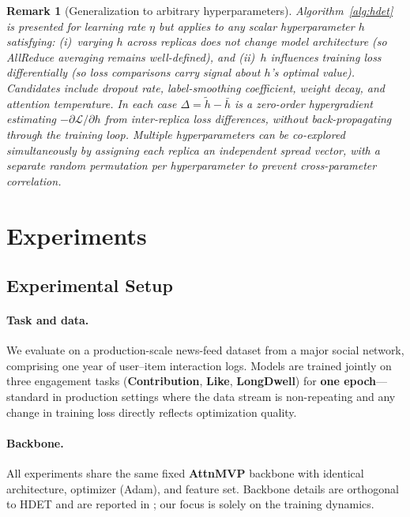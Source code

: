 \documentclass{article}
\newtheorem{remark}{Remark}
\begin{document}
\begin{remark}[Generalization to arbitrary hyperparameters]
\label{rem:general}
Algorithm~\ref{alg:hdet} is presented for learning rate $\eta$ but applies to any
scalar hyperparameter $h$ satisfying: (i)~varying $h$ across replicas does not
change model architecture (so AllReduce averaging remains well-defined), and
(ii)~$h$ influences training loss differentially (so loss comparisons carry signal
about $h$'s optimal value).
Candidates include dropout rate, label-smoothing coefficient, weight decay, and
attention temperature.
In each case $\Delta = \tilde{h} - \bar{h}$ is a zero-order hypergradient
estimating $-\partial\mathcal{L}/\partial h$ from inter-replica loss differences,
without back-propagating through the training loop.
Multiple hyperparameters can be co-explored simultaneously by assigning each replica
an independent spread vector, with a separate random permutation per hyperparameter
to prevent cross-parameter correlation.
\end{remark}

\section{Experiments}
\label{sec:experiments}

\subsection{Experimental Setup}

\paragraph{Task and data.}
We evaluate on a production-scale news-feed dataset from a major
social network, comprising one year of user--item interaction logs.
Models are trained jointly on three engagement tasks (\textbf{Contribution},
\textbf{Like}, \textbf{LongDwell}) for \textbf{one epoch}---standard in
production settings where the data stream is non-repeating and any change
in training loss directly reflects optimization quality.

\paragraph{Backbone.}
All experiments share the same fixed \textbf{AttnMVP} backbone
\citep{cheng2026} with identical architecture, optimizer (Adam), and
feature set.  Backbone details are orthogonal to HDET and are reported
in \citet{cheng2026}; our focus is solely on the training dynamics.
\end{document}
